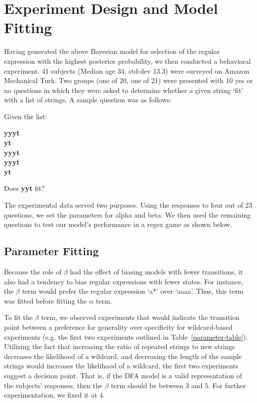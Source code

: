 \documentclass[10pt,letterpaper]{article}
\begin{document}
\section{Experiment Design and Model Fitting}
Having generated the above Bayesian model for selection of the regular expression with the highest posterior probability, we then conducted a behavioral experiment.  41 subjects (Median age 34, std-dev 13.3) were surveyed on Amazon Mechanical Turk. Two groups (one of 20, one of 21) were presented with 10 yes or no questions in which they were asked to determine whether a given string `fit' with a list of strings. A sample question was as follows:
\begin{center}Given the list:

\textbf{yyyt \\
yt \\
yyyt \\
yyyt \\ 
yt}

Does \textbf{yyt} fit?
\end{center}

The experimental data served two purposes. Using the responses to four out of 23 questions, we set the parameters for alpha and beta. We then used the remaining questions to test our model's performance in a regex game as shown below. 

\subsection{Parameter Fitting}
Because the role of $\beta$ had the effect of biasing models with fewer transitions, it also had a tendency to bias regular expressions with fewer states. For instance, the $\beta$ term would prefer the regular expression `a*' over `aaaa'. Thus, this term was fitted before fitting the $\alpha$ term.

To fit the $\beta$ term, we observed experiments that would indicate the transition point between a preference for generality over specificity for wildcard-based experiments (e.g. the first two experiments outlined in Table~\ref{parameter-table}). Utilizing the fact that increasing the ratio of repeated strings to new strings decreases the likelihood of a wildcard, and decreasing the length of the sample strings would increases the likelihood of a wildcard, the first two experiments suggest a decision point. That is, if the DFA model is a valid representation of the subjects' responses, then the $\beta$ term should be between $3$ and $5$. For further experimentation, we fixed it at $4$.
\end{document}
